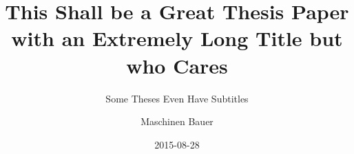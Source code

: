 \title{This Shall be a Great Thesis Paper with an Extremely Long Title but who Cares}
\subtitle{Some Theses Even Have Subtitles}
\author{Maschinen Bauer}
\date{2015-08-28}

\usepackage{lipsum}
